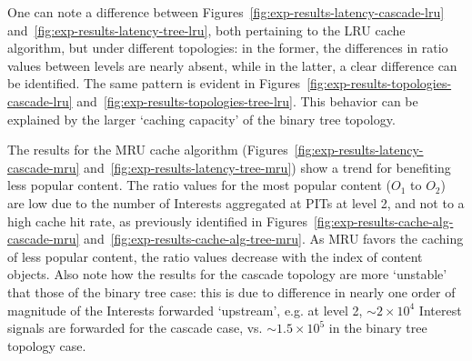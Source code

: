 One can note a difference between Figures~\ref{fig:exp-results-latency-cascade-lru} 
and~\ref{fig:exp-results-latency-tree-lru}, both pertaining to the LRU cache 
algorithm, but under different topologies: in the former, the differences in 
ratio values between levels are nearly absent, while in the latter, a clear difference 
can be identified. The same pattern is evident in 
Figures~\ref{fig:exp-results-topologies-cascade-lru} and~\ref{fig:exp-results-topologies-tree-lru}. 
This behavior can be explained by the larger `caching capacity' of the binary 
tree topology.\shortvertbreak

The results for the MRU cache algorithm (Figures~\ref{fig:exp-results-latency-cascade-mru} 
and~\ref{fig:exp-results-latency-tree-mru}) show a trend for benefiting less 
popular content. The ratio values for the 
most popular content ($O_1$ to $O_2$) are low due to the number of Interests aggregated 
at PITs at level 2, and not to a high cache hit rate, as previously identified in Figures~\ref{fig:exp-results-cache-alg-cascade-mru} 
and~\ref{fig:exp-results-cache-alg-tree-mru}. As MRU favors the caching of less popular 
content, the ratio values decrease with the index of content objects. Also note how the 
results for the cascade topology are more `unstable' that those of the binary 
tree case: this is due to difference in nearly one order of magnitude of the 
Interests forwarded `upstream', e.g. at level 2, $\sim2 \times 10^4$ Interest signals 
are forwarded for the cascade case, vs. $\sim1.5 \times 10^5$ in the binary 
tree topology case.\shortvertbreak

